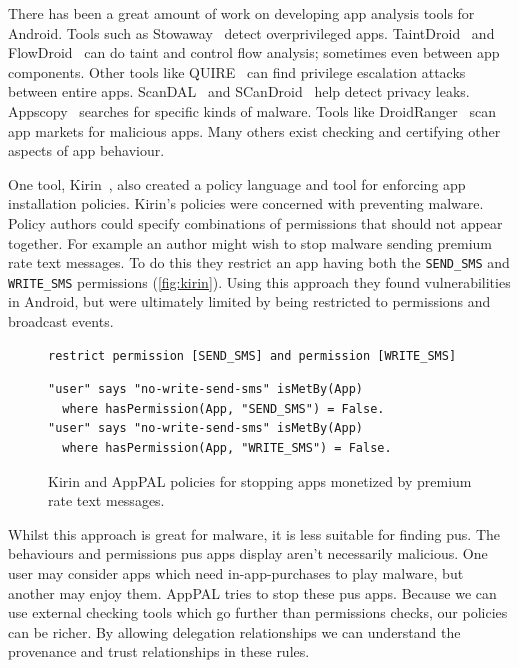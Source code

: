 \documentclass[twoside,letterpaper]{soups}
\begin{document}
There has been a great amount of work on developing app analysis tools for Android.
Tools such as Stowaway~\citep{Felt:2011kj} detect overprivileged apps.
TaintDroid~\citep{Enck:2010uw} and FlowDroid~\citep{Fritz:2013vi} can do taint and control flow analysis; sometimes even between app components.
Other tools like QUIRE~\citep{Bugiel:2012ui} can find privilege escalation attacks between entire apps.
ScanDAL~\citep{Kim:2012vt} and SCanDroid~\citep{Fuchs:2009vi} help detect privacy leaks.
Appscopy~\citep{Feng:kPGZr_ja} searches for specific kinds of malware.
Tools like DroidRanger~\citep{Zhou:2012tb} scan app markets for malicious apps.
Many others exist checking and certifying other aspects of app behaviour.

One tool, Kirin~\citep{Enck:2009ko}, also created a policy language and tool for enforcing app installation policies.
Kirin's policies were concerned with preventing malware.
Policy authors could specify combinations of permissions that should not appear together.
For example an author might wish to stop malware sending premium rate text messages.
To do this they restrict an app having both the \texttt{SEND\_SMS} and \texttt{WRITE\_SMS} permissions (\autoref{fig:kirin}).
Using this approach they found vulnerabilities in Android, but were ultimately limited by being restricted to permissions and broadcast events.
\begin{figure}
\begin{lstlisting}
restrict permission [SEND_SMS] and permission [WRITE_SMS]
\end{lstlisting}
\begin{lstlisting}
"user" says "no-write-send-sms" isMetBy(App)
  where hasPermission(App, "SEND_SMS") = False.
"user" says "no-write-send-sms" isMetBy(App)
  where hasPermission(App, "WRITE_SMS") = False.
\end{lstlisting}
\caption{Kirin and AppPAL policies for stopping apps monetized by premium rate text messages.}
\label{fig:kirin}
\end{figure}

Whilst this approach is great for malware, it is less suitable for finding \ac{pus}.
The behaviours and permissions \ac{pus} apps display aren't necessarily malicious.
One user may consider apps which need in-app-purchases to play malware, but another may enjoy them.
AppPAL tries to stop these \ac{pus} apps.
Because we can use external checking tools which go further than permissions checks, our policies can be richer.
By allowing delegation relationships we can understand the provenance and trust relationships in these rules.
\end{document}
